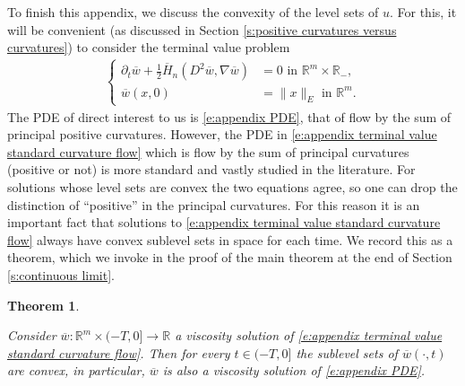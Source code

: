 \documentclass[reqno]{amsart}
\newtheorem{theorem}{Theorem}[section]
\numberwithin{equation}{section}
\begin{document}
To finish this appendix, we discuss the convexity of the level sets of $u$. For this, it will be convenient (as discussed in Section \ref{s:positive curvatures versus curvatures}) to consider the terminal value problem
\begin{align}\label{e:appendix terminal value standard curvature flow}
  \left \{ \begin{array}{rl} \partial_t \overline w + \tfrac{1}{2}\overline H_n(D^2\overline w,\nabla \overline w) & = 0 \text{ in } \mathbb{R}^m\times \mathbb{R}_-,\\
  \overline w(x,0) & = \|x\|_E \text{ in } \mathbb{R}^m.\end{array} \right.
\end{align}
The PDE of direct interest to us is \eqref{e:appendix PDE}, that of flow by the sum of principal positive curvatures. However, the PDE in \eqref{e:appendix terminal value standard curvature flow} which is flow by the sum of principal curvatures (positive or not) is more standard and vastly studied in the literature. For solutions whose level sets are convex the two equations agree, so one can drop the distinction of ``positive'' in the principal curvatures. For this reason it is an important fact that solutions to \eqref{e:appendix terminal value standard curvature flow} always have convex sublevel sets in space for each time. We record this as a theorem, which we invoke in the proof of the main theorem at the end of Section \ref{s:continuous limit}.

\begin{theorem}\label{t:convex level sets}

Consider $\overline w:\mathbb{R}^m\times (-T,0]\to\mathbb{R}$ a viscosity solution of \eqref{e:appendix terminal value standard curvature flow}. Then for every $t \in (-T,0]$ the sublevel sets of $\overline w(\cdot,t)$ are convex, in particular, $\overline w$ is also a viscosity solution of \eqref{e:appendix PDE}. 
    
\end{theorem}
\end{document}
